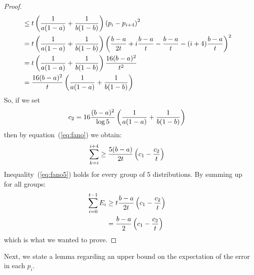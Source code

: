 \begin{proof}
\begin{align*}
    &\leq
    t\left(\frac{1}{a(1-a)} + \frac{1}{b(1-b)}\right) \left(p_i - p_{i+4}\right)^2\\
    &=
    t\left(\frac{1}{a(1-a)} + \frac{1}{b(1-b)}\right)\left(\frac{b-a}{2t} +
    i\frac{b-a}{t} - \frac{b-a}{t} -(i+4)\frac{b-a}{t}\right)^2\\
    &=
    t\left(\frac{1}{a(1-a)} + \frac{1}{b(1-b)}\right) \frac{16(b-a)^2}{t^2}\\
    &=
    \frac{16(b-a)^2}{t} \left(\frac{1}{a(1-a)} + \frac{1}{b(1-b)}\right)
  \end{align*}
  So, if we set
  $$c_2 = 16\frac{(b-a)^2}{\log5}\left(\frac{1}{a(1-a)} + \frac{1}{b(1-b)}\right)$$
  then by equation~(\ref{eq:fano}) we obtain:
  \begin{equation}\label{eq:fano5}
    \sum_{k =i}^{i+4} \geq \frac{5(b-a)}{2t}\left(c_1 - \frac{c_2}{t}\right)
  \end{equation}
  Inequality~(\ref{eq:fano5}) holds for every group of 5
  distributions. By summing up for all groups:
  \begin{align*}
    \sum_{i=0}^{t-1} E_i &\geq t \frac{b-a}{2t}\left(c_1 - \frac{c_2}{t}\right)\\
    &= \frac{b-a}{2}\left(c_1 - \frac{c_2}{t}\right)
  \end{align*}
  which is what we wanted to prove.
\end{proof}

Next, we state a lemma regarding an upper bound on the
expectation of the error in each $p_i$.

